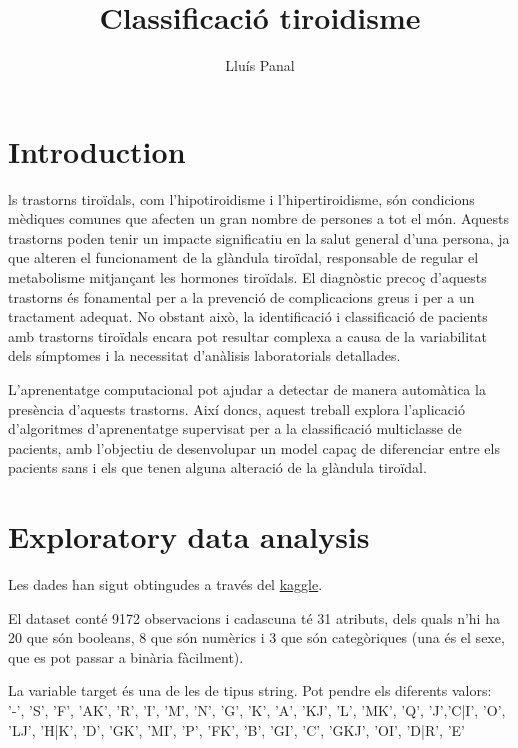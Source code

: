 \documentclass[9pt,a4paper,twoside]{tau-class/tau}
\title{Classificació tiroidisme}
\author[a,1]{Lluís Panal}
\affil[a]{1668072}
\begin{document}
    \maketitle 
    \thispagestyle{firststyle} \tauabstract 
    \tableofcontents
    \linenumbers 
    

\section{Introduction}

    ls trastorns tiroïdals, com l'hipotiroidisme i l'hipertiroidisme, són condicions mèdiques comunes que afecten un gran nombre de persones a tot el món. Aquests trastorns poden tenir un impacte significatiu en la salut general d'una persona, ja que alteren el funcionament de la glàndula tiroïdal, responsable de regular el metabolisme mitjançant les hormones tiroïdals. El diagnòstic precoç d'aquests trastorns és fonamental per a la prevenció de complicacions greus i per a un tractament adequat. No obstant això, la identificació i classificació de pacients amb trastorns tiroïdals encara pot resultar complexa a causa de la variabilitat dels símptomes i la necessitat d'anàlisis laboratorials detallades.

    L'aprenentatge computacional pot ajudar a detectar de manera automàtica la presència d'aquests trastorns. Així doncs, aquest treball explora l'aplicació d'algoritmes d'aprenentatge supervisat per a la classificació multiclasse de pacients, amb l'objectiu de desenvolupar un model capaç de diferenciar entre els pacients sans i els que tenen alguna alteració de la glàndula tiroïdal.

\section{Exploratory data analysis}
    Les dades han sigut obtingudes a través del \href{https://www.kaggle.com/datasets/emmanuelfwerr/thyroid-disease-data/data}{kaggle}.

    El dataset conté 9172 observacions i cadascuna té 31 atributs, dels quals n'hi ha 20 que són booleans, 8 que són numèrics i 3 que són categòriques (una és el sexe, que es pot passar a binària fàcilment). 
    
    La variable target és una de les de tipus string. Pot pendre els diferents valors: 
    '-', 'S', 'F', 'AK', 'R', 'I', 'M', 'N', 'G', 'K', 'A', 'KJ', 'L', 'MK', 'Q', 'J','C|I', 'O', 'LJ', 'H|K', 'D', 'GK', 'MI', 'P', 'FK', 'B', 'GI', 'C', 'GKJ', 'OI', 'D|R', 'E'
\end{document}
